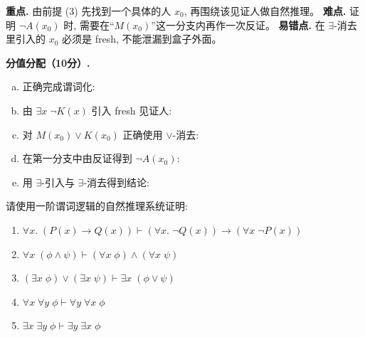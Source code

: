 \documentclass[a4paper, justified]{tufte-handout}
\begin{document}
\begin{solution}
  \begin{remark}
    \textbf{重点.} 由前提 (3) 先找到一个具体的人 $x_0$, 再围绕该见证人做自然推理。
    \textbf{难点.} 证明 $\lnot A(x_0)$ 时, 需要在“$M(x_0)$”这一分支内再作一次反证。
    \textbf{易错点.} 在 $\exists$-消去里引入的 $x_0$ 必须是 fresh, 不能泄漏到盒子外面。
  \end{remark}

  \textbf{分值分配（10分）.}
  \begin{enumerate}[(a)]
    \item 正确完成谓词化: 
    \item 由 $\exists x\; \lnot K(x)$ 引入 fresh 见证人: 
    \item 对 $M(x_0) \lor K(x_0)$ 正确使用 $\lor$-消去: 
    \item 在第一分支中由反证得到 $\lnot A(x_0)$: 
    \item 用 $\exists$-引入与 $\exists$-消去得到结论: 
  \end{enumerate}
\end{solution}

\newpage
\begin{problem}
  请使用一阶谓词逻辑的自然推理系统证明:
  \begin{enumerate}[(1)]
    \item $\forall x.\; (P(x) \to Q(x)) \vdash
      (\forall x.\; \lnot Q(x)) \to (\forall x\; \lnot P(x))$
    \item $\forall x\; (\phi \land \psi) \vdash
      (\forall x\; \phi) \land (\forall x\; \psi)$
    \item $(\exists x\; \phi) \lor (\exists x\; \psi) \vdash
      \exists x\; (\phi \lor \psi)$
    \item $\forall x\; \forall y\; \phi \vdash \forall y\; \forall x\; \phi$
    \item $\exists x\; \exists y\; \phi \vdash
      \exists y\; \exists x\; \phi$
  \end{enumerate}
\end{problem}
\end{document}
